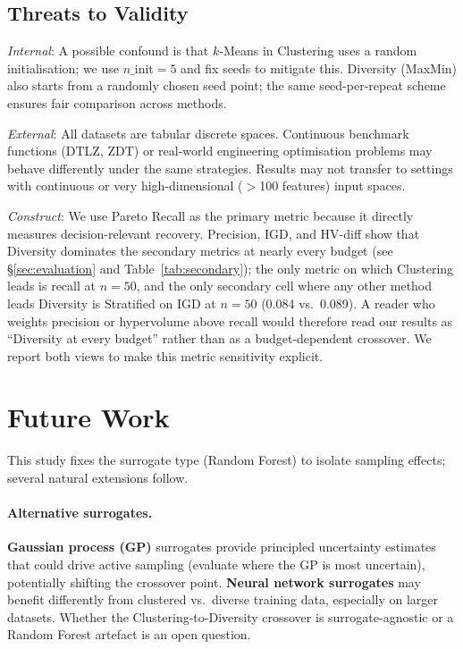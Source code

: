 \documentclass[sigconf,nonacm]{acmart}
\begin{document}
\subsection{Threats to Validity}
\label{sec:threats}

\textit{Internal}: A possible confound is that $k$-Means in Clustering uses a
random initialisation; we use $n\_\text{init}=5$ and fix seeds to mitigate
this.
Diversity (MaxMin) also starts from a randomly chosen seed point; the same
seed-per-repeat scheme ensures fair comparison across methods.

\textit{External}: All datasets are tabular discrete spaces.
Continuous benchmark functions (DTLZ, ZDT) or real-world engineering
optimisation problems may behave differently under the same strategies.
Results may not transfer to settings with continuous or very high-dimensional
($>$100 features) input spaces.

\textit{Construct}: We use Pareto Recall as the primary metric because it
directly measures decision-relevant recovery.
Precision, IGD, and HV-diff show that Diversity dominates the secondary
metrics at nearly every budget (see \S\ref{sec:evaluation} and
Table~\ref{tab:secondary}); the only metric on which Clustering leads is
recall at $n=50$, and the only secondary cell where any other method leads
Diversity is Stratified on IGD at $n=50$ (0.084 vs.\ 0.089).
A reader who weights precision or hypervolume above recall would therefore
read our results as ``Diversity at every budget'' rather than as a
budget-dependent crossover.
We report both views to make this metric sensitivity explicit.

\section{Future Work}
\label{sec:futurework}

This study fixes the surrogate type (Random Forest) to isolate sampling
effects; several natural extensions follow.

\paragraph{Alternative surrogates.}
\textbf{Gaussian process (GP)} surrogates provide principled uncertainty
estimates that could drive active sampling (evaluate where the GP is most
uncertain), potentially shifting the crossover point.
\textbf{Neural network surrogates} may benefit differently from clustered
vs.\ diverse training data, especially on larger datasets.
Whether the Clustering-to-Diversity crossover is surrogate-agnostic or a
Random Forest artefact is an open question.
\end{document}
